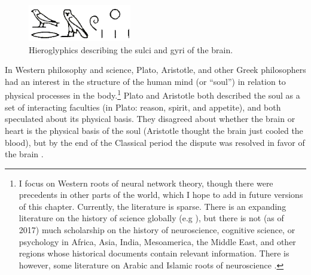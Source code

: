 \begin{figure}[h]
\centering
\includegraphics[width=0.4\textwidth]{images/papyrus.png}
\caption[From \url{https://faculty.washington.edu/chudler/papy.html}]{Hieroglyphics describing the sulci and gyri of the brain.}
\label{papyrus}
\end{figure}

In Western philosophy and science, Plato, Aristotle, and other Greek philosophers had an interest in the structure of the human mind (or ``soul'') in relation to physical processes in the body.\footnote{I focus on Western roots of neural network theory, though there were precedents in other parts of the world, which I hope to add in future versions of this chapter. Currently, the literature is sparse. There is an expanding literature on the history of science globally (e.g \cite{selin2013encyclopaedia}), but there is not (as of 2017) much scholarship on the history of neuroscience, cognitive science, or psychology in Africa, Asia, India, Mesoamerica, the Middle East, and other regions whose historical documents contain relevant information. There is however, some literature on  Arabic and Islamic roots of neuroscience \cite{mohamed2008arab}.}  Plato and Aristotle both described the soul as a set of interacting faculties (in Plato: reason, spirit, and appetite), and both speculated about its physical basis. They disagreed  about whether the brain or heart is the physical basis of the soul (Aristotle thought the brain just cooled the blood), but by the end of the Classical period the dispute was resolved in favor of the brain \cite{finger2001origins}.

